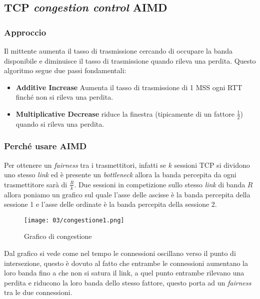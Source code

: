     \subsection[\texttt{TCP} \textit{congestion control: additive increase multiplicative decrease} (\texttt{AIMD})]{\Acrshort*{TCP} \textit{congestion control} \Acrfull*{AIMD}}
        \subsubsection{Approccio}
            Il mittente aumenta il tasso di trasmissione cercando di occupare la banda disponibile e diminuisce il tasso di trasmissione quando rileva una perdita. Questo algoritmo segue due passi fondamentali: \begin{itemize}
                \item \textbf{Additive Increase} Aumenta il tasso di trasmissione di 1 \Acrshort*{MSS} ogni \Acrshort*{RTT} finché non si rileva una perdita.
                \item \textbf{Multiplicative Decrease} riduce la finestra (tipicamente di un fattore $ \frac{1}{2} $) quando si rileva una perdita.
            \end{itemize}
        \subsubsection{Perché usare \Acrshort*{AIMD}}
            Per ottenere un \textit{fairness} tra i trasmettitori, infatti se $ k $ sessioni \Acrshort*{TCP} si dividono uno stesso \textit{link} ed è presente un \textit{bottleneck} allora la banda percepita da ogni trasmettitore sarà di $ \frac{R}{k} $.\newline
            Due sessioni in competizione sullo stesso \textit{link} di banda $ R $ allora poniamo un grafico sul quale l'asse delle ascisse è la banda percepita della sessione 1 e l'asse delle ordinate è la banda percepita della sessione 2. 
            \begin{figure}[H]
                \centering
                \texttt{[image: 03/congestione1.png]}
                \caption{Grafico di congestione}
            \end{figure}
            Dal grafico si vede come nel tempo le connessioni oscillano verso il punto di intersezione, questo è dovuto al fatto che entrambe le connessioni aumentano la loro banda fino a che non si satura il link, a quel punto entrambe rilevano una perdita e riducono la loro banda dello stesso fattore, questo porta ad un \textit{fairness} tra le due connessioni.
